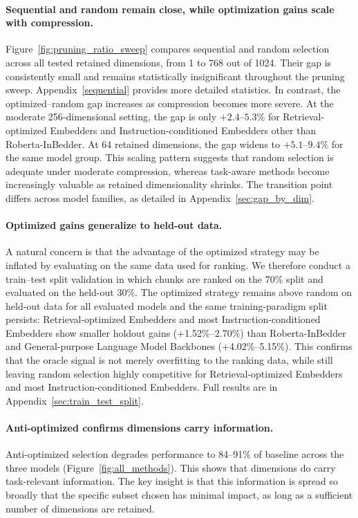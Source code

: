 \documentclass[11pt,a4paper]{article}
\begin{document}
\paragraph{Sequential and random remain close, while optimization gains scale with compression.}
Figure~\ref{fig:pruning_ratio_sweep} compares sequential and random selection across all tested retained dimensions, from 1 to 768 out of 1024. Their gap is consistently small and remains statistically insignificant throughout the pruning sweep. Appendix~\ref{sequential} provides more detailed statistics. In contrast, the optimized--random gap increases as compression becomes more severe. At the moderate 256-dimensional setting, the gap is only $+2.4$--$5.3\%$ for Retrieval-optimized Embedders and Instruction-conditioned Embedders other than Roberta-InBedder. At 64 retained dimensions, the gap widens to $+5.1$--$9.4\%$ for the same model group. This scaling pattern suggests that random selection is adequate under moderate compression, whereas task-aware methods become increasingly valuable as retained dimensionality shrinks. The transition point differs across model families, as detailed in Appendix~\ref{sec:gap_by_dim}.

\paragraph{Optimized gains generalize to held-out data.}
A natural concern is that the advantage of the optimized strategy may be inflated by evaluating on the same data used for ranking. We therefore conduct a train--test split validation in which chunks are ranked on the 70\% split and evaluated on the held-out 30\%. The optimized strategy remains above random on held-out data for all evaluated models and the same training-paradigm split persists: Retrieval-optimized Embedders and most Instruction-conditioned Embedders show smaller holdout gains (+1.52\%--2.70\%) than Roberta-InBedder and General-purpose Language Model Backbones (+4.02\%--5.15\%). This confirms that the oracle signal is not merely overfitting to the ranking data, while still leaving random selection highly competitive for Retrieval-optimized Embedders and most Instruction-conditioned Embedders. Full results are in Appendix~\ref{sec:train_test_split}.

\paragraph{Anti-optimized confirms dimensions carry information.}
Anti-optimized selection degrades performance to 84--91\% of baseline across the three models (Figure~\ref{fig:all_methods}). This shows that dimensions do carry task-relevant information. The key insight is that this information is spread so broadly that the specific subset chosen has minimal impact, as long as a sufficient number of dimensions are retained.
\end{document}
